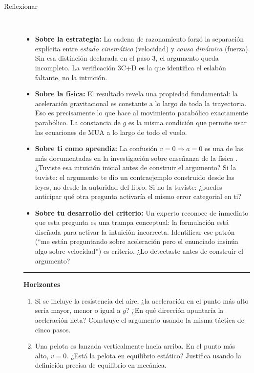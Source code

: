\documentclass[11pt]{book}
\begin{document}
\begin{enumerate}
\begin{description}
\item[Reflexionar]~
\begin{itemize}
    \item {\bf Sobre la estrategia:} La cadena de razonamiento forzó la separación explícita entre {\it estado cinemático} (velocidad) y {\it causa dinámica} (fuerza). Sin esa distinción declarada en el paso 3, el argumento queda incompleto. La verificación 3C+D es la que identifica el eslabón faltante, no la intuición.
    \item {\bf Sobre la física:} El resultado revela una propiedad fundamental: la aceleración gravitacional es constante a lo largo de toda la trayectoria. Eso es precisamente lo que hace al movimiento parabólico exactamente parabólico. La constancia de $g$ es la misma condición que permite usar las ecuaciones de MUA a lo largo de todo el vuelo.
    \item {\bf Sobre ti como aprendiz:} La confusión $v = 0 \Rightarrow a = 0$ es una de las más documentadas en la investigación sobre enseñanza de la física \cite{Mestre2020}. ¿Tuviste esa intuición inicial antes de construir el argumento? Si la tuviste: el argumento te dio un contraejemplo construido desde las leyes, no desde la autoridad del libro. Si no la tuviste: ¿puedes anticipar qué otra pregunta activaría el mismo error categorial en ti?
    \item {\bf Sobre tu desarrollo del criterio:} Un experto reconoce de inmediato que esta pregunta es una trampa conceptual: la formulación está diseñada para activar la intuición incorrecta. Identificar ese patrón (``me están preguntando sobre aceleración pero el enunciado insinúa algo sobre velocidad'') es criterio. ¿Lo detectaste antes de construir el argumento?
\end{itemize}

\medskip
\noindent\rule{\linewidth}{0.4pt}
\noindent\textbf{Horizontes}
\medskip

\begin{enumerate}
    \item Si se incluye la resistencia del aire, ¿la aceleración en el punto más alto sería mayor, menor o igual a $g$? ¿En qué dirección apuntaría la aceleración neta? Construye el argumento usando la misma táctica de cinco pasos.
    \item Una pelota es lanzada verticalmente hacia arriba. En el punto más alto, $v = 0$. ¿Está la pelota en equilibrio estático? Justifica usando la definición precisa de equilibrio en mecánica.
\end{enumerate}

\end{description}
\end{enumerate}
\end{document}
